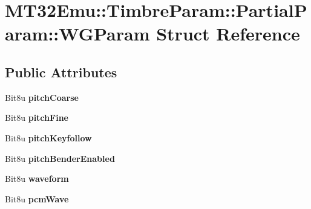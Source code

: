 \hypertarget{structMT32Emu_1_1TimbreParam_1_1PartialParam_1_1WGParam}{\section{M\-T32\-Emu\-:\-:Timbre\-Param\-:\-:Partial\-Param\-:\-:W\-G\-Param Struct Reference}
\label{structMT32Emu_1_1TimbreParam_1_1PartialParam_1_1WGParam}
}
\subsection*{Public Attributes}
\begin{DoxyCompactItemize}
\item 
\hypertarget{structMT32Emu_1_1TimbreParam_1_1PartialParam_1_1WGParam_a670123f4a8c6e55ff3bcc281181985f9}{Bit8u {\bfseries pitch\-Coarse}}\label{structMT32Emu_1_1TimbreParam_1_1PartialParam_1_1WGParam_a670123f4a8c6e55ff3bcc281181985f9}

\item 
\hypertarget{structMT32Emu_1_1TimbreParam_1_1PartialParam_1_1WGParam_a352230d9f51ba303106f79c54897b5b0}{Bit8u {\bfseries pitch\-Fine}}\label{structMT32Emu_1_1TimbreParam_1_1PartialParam_1_1WGParam_a352230d9f51ba303106f79c54897b5b0}

\item 
\hypertarget{structMT32Emu_1_1TimbreParam_1_1PartialParam_1_1WGParam_a76c9c52f2d71852f8f95864b1d0bcd4e}{Bit8u {\bfseries pitch\-Keyfollow}}\label{structMT32Emu_1_1TimbreParam_1_1PartialParam_1_1WGParam_a76c9c52f2d71852f8f95864b1d0bcd4e}

\item 
\hypertarget{structMT32Emu_1_1TimbreParam_1_1PartialParam_1_1WGParam_ae54b0d26c0bcf6a35c7c90986039df6a}{Bit8u {\bfseries pitch\-Bender\-Enabled}}\label{structMT32Emu_1_1TimbreParam_1_1PartialParam_1_1WGParam_ae54b0d26c0bcf6a35c7c90986039df6a}

\item 
\hypertarget{structMT32Emu_1_1TimbreParam_1_1PartialParam_1_1WGParam_a53c0add0f1dc1d82dbc4093308cb8fc9}{Bit8u {\bfseries waveform}}\label{structMT32Emu_1_1TimbreParam_1_1PartialParam_1_1WGParam_a53c0add0f1dc1d82dbc4093308cb8fc9}

\item 
\hypertarget{structMT32Emu_1_1TimbreParam_1_1PartialParam_1_1WGParam_afc6ce420c202bc79a0701de8f6c79711}{Bit8u {\bfseries pcm\-Wave}}\label{structMT32Emu_1_1TimbreParam_1_1PartialParam_1_1WGParam_afc6ce420c202bc79a0701de8f6c79711}


\end{DoxyCompactItemize}
